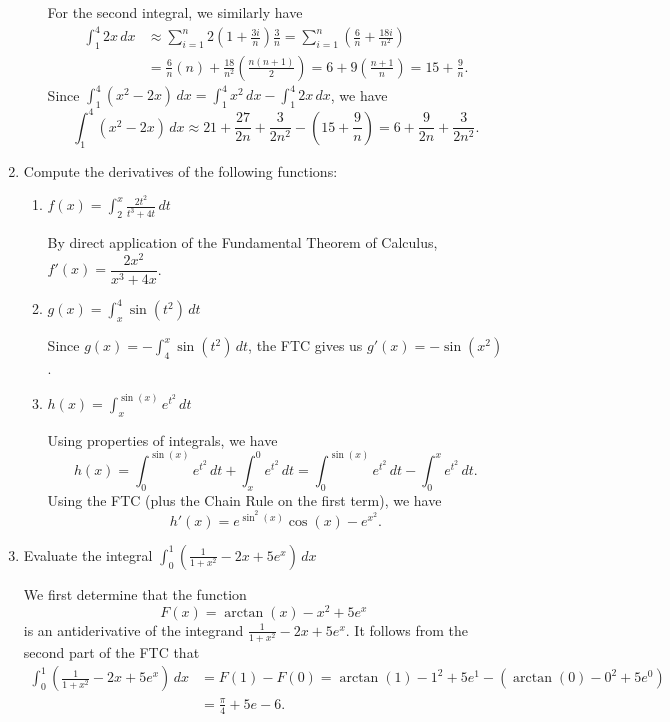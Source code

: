 \documentclass[12pt]{article}
\newcommand{\di}{\displaystyle}
\begin{document}
\begin{enumerate}
\begin{enumerate}
For the second integral, we similarly have
\begin{align*}
 \int_1^4 2x\,dx & \approx \sum_{i=1}^n 2\left(1+\frac{3i}{n}\right)\frac{3}{n} = \sum_{i=1}^n \left(\frac{6}{n}+\frac{18i}{n^2}\right)\\
  & = \frac{6}{n}(n)+\frac{18}{n^2}\left(\frac{n(n+1)}{2}\right) = 6 +9\left(\frac{n+1}{n}\right) = 15+\frac{9}{n}.
\end{align*}
Since $\int_1^4(x^2-2x)\,dx = \int_1^4x^2\,dx-\int_1^4 2x\,dx$, we have
\[
 \int_1^4(x^2-2x)\,dx \approx 21+\frac{27}{2n}+\frac{3}{2n^2}-\left(15+\frac{9}{n}\right) = 6+\frac{9}{2n}+\frac{3}{2n^2}.
\]

\end{enumerate}


 \item Compute the derivatives of the following functions:
\begin{enumerate}
 \item $\di f(x) = \int_2^x\frac{2t^2}{t^3+4t}\,dt$

\medskip

By direct application of the Fundamental Theorem of Calculus, $f'(x)=\dfrac{2x^2}{x^3+4x}$.

\medskip

 \item $\di g(x) = \int_x^4\sin(t^2)\,dt$

\medskip

Since $g(x) = -\int_4^x\sin(t^2)\,dt$, the FTC gives us $g'(x) = -\sin(x^2)$.

\medskip

 \item $\di h(x) = \int_x^{\sin(x)} e^{t^2}\,dt$

\medskip

Using properties of integrals, we have 
\[
 h(x) = \int_0^{\sin(x)}e^{t^2}\,dt + \int_x^0e^{t^2}\,dt = \int_0^{\sin(x)}e^{t^2}\,dt -\int_0^xe^{t^2}\,dt.
\]
Using the FTC (plus the Chain Rule on the first term), we have
\[
 h'(x) = e^{\sin^2(x)}\cos(x)-e^{x^2}.
\]

\medskip

\end{enumerate}

 \item Evaluate the integral $\di \int_0^1\left(\frac{1}{1+x^2}-2x+5e^x\right)\,dx$

\medskip

We first determine that the function 
\[
 F(x) = \arctan(x)-x^2+5e^x
\]
is an antiderivative of the integrand $\frac{1}{1+x^2}-2x+5e^x$. It follows from the second part of the FTC that
\begin{align*}
 \int_0^1\left(\frac{1}{1+x^2}-2x+5e^x\right)\,dx &= F(1)-F(0) = \arctan(1)-1^2+5e^1 - (\arctan(0)-0^2+5e^0)\\& = \frac{\pi}{4}+5e-6.
\end{align*}

\end{enumerate}
\end{document}
